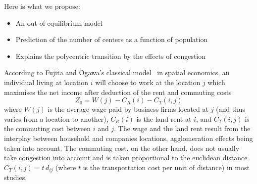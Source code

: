 Here is what we propose:

\begin{itemize}
    \item An out-of-equilibrium model
    \item Prediction of the number of centers as a function of population
    \item Explains the polycentric transition by the effects of congestion
\end{itemize}

According to Fujita and Ogawa's classical model~\cite{Fujita:1982} in
spatial economics, an individual living at location $i$ will choose to
work at the location $j$ which maximises the net income after
deduction of the rent and commuting costs~\cite{Fujita:1982}
%
\begin{equation}
Z_0=W(j)-C_R(i)-C_T(i,j)
\end{equation} 
%
where $W(j)$ is the average wage paid by business firms located at $j$
(and thus varies from a location to another), $C_R(i)$ is the land
rent at $i$, and $C_T(i,j)$ is the commuting cost between $i$ and
$j$. The wage and the land rent result from the interplay between
household and companies locations, agglomeration effects being taken
into account. The commuting cost, on the other hand, does not usually take congestion 
into account and is taken proportional to the euclidean distance
$C_T(i,j) = t\, d_{ij}$ (where $t$ is the transportation cost per unit
of distance) in most studies.


